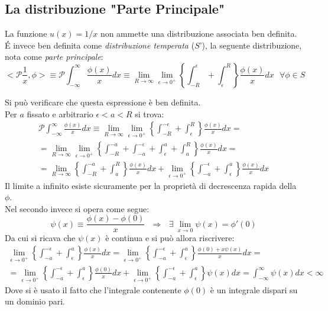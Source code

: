 \documentclass[twoside]{article}
\begin{document}
\subsection{La distribuzione "Parte Principale"}
La funzione $u(x)=1/x$ non ammette una distribuzione associata ben definita.
\\
\'E invece ben definita come \textit{distribuzione temperata} ($S$'), la seguente distribuzione, nota come \textit{parte principale}:
\begin{equation}\label{P}
    <\mathscr{P}\frac{1}{x},\phi>\equiv \mathscr{P}\int_{-\infty}^{\infty}\frac{\phi(x)}{x}dx \equiv \lim_{R\to \infty} \lim_{\epsilon \to 0^+}\left\{ \int_{-R}^{\epsilon} + \int_{\epsilon}^{R} \right\} \frac{\phi(x)}{x}dx \ \ \ \forall \phi \in S
\end{equation}

Si può verificare che questa espressione è ben definita.
\\
Per $a$ fissato e arbitrario $\epsilon<a<R$ si trova:
\begin{equation}
    \begin{split}
        \mathscr{P}\int_{-\infty}^{\infty} \frac{\phi(x)}{x}dx \equiv \lim_{R\to \infty} \lim_{\epsilon \to 0^+}\left\{ \int_{-R}^{-\epsilon} + \int_{\epsilon}^{R} \right\}\frac{\phi(x)}{x}dx= \\
        = \lim_{R\to \infty} \lim_{\epsilon \to 0^+}\left\{ \int_{-R}^{-a} + \int_{-a}^{-\epsilon} + \int_{\epsilon}^a +\int_a ^R \right\}\frac{\phi(x)}{x}dx = \\
        = \lim_{R\to \infty}\left\{ \int_{-R}^{-a} + \int_a ^R \right\}\frac{\phi(x)}{x}dx + \lim_{\epsilon \to 0^+}\left\{ \int_{-a}^{-\epsilon} + \int_{\epsilon}^a \right\}\frac{\phi(x)}{x}dx
    \end{split}
\end{equation}
Il limite a infinito esiste sicuramente per la proprietà di decrescenza rapida della $\phi$.
\\
Nel secondo invece si opera come segue:
\begin{equation}
    \psi(x) \equiv \frac{\phi(x)-\phi(0)}{x} \ \ \ \Rightarrow \ \ \ \exists \ \lim_{x\to 0}\psi(x)=\phi ' (0)
\end{equation}
Da cui si ricava che $\psi(x)$ è continua e si può allora riscrivere:
\begin{equation}
   \begin{split}
    \lim_{\epsilon \to 0^+}\left\{ \int_{-a}^{-\epsilon} + \int_{\epsilon}^a \right\}\frac{\phi(x)}{x}dx=\lim_{\epsilon \to 0^+}\left\{ \int_{-a}^{-\epsilon} + \int_{\epsilon}^a \right\}\frac{\phi(0)+x\psi(x)}{x}dx=\\
    =\lim_{\epsilon \to 0^+}\left\{ \int_{-a}^{-\epsilon} + \int_{\epsilon}^a \right \}\frac{\phi(0)}{x}dx + \lim_{\epsilon \to 0^+}\left\{ \int_{-a}^{-\epsilon} + \int_{\epsilon}^a \right\} \psi(x)dx=\int_{-\infty}^{\infty}\psi(x)dx < \infty
    \end{split}
\end{equation}
Dove si è usato il fatto che l'integrale contenente $\phi(0)$ è un integrale dispari su un dominio pari.
\end{document}
